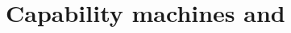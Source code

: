 \documentclass[aspectratio=169]{beamer}
\begin{document}


    
    
    
\section{Capability machines and \stktokens{}}
\end{document}
